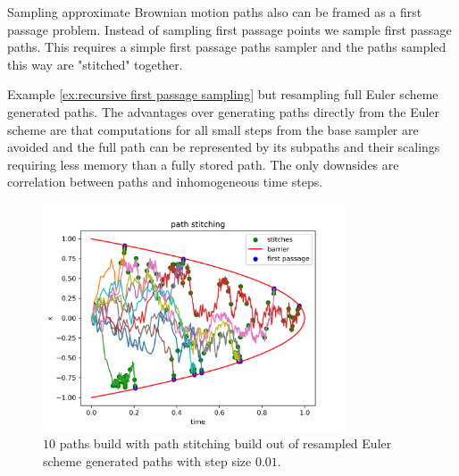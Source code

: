 \documentclass[a4paper,12pt]{article}
\begin{document}
\begin{technique}
  Sampling approximate Brownian motion paths also can be
  framed as a first passage problem. Instead of sampling
  first passage points we sample first passage paths.
  This requires a simple first passage paths sampler and the paths
  sampled this way are "stitched" together.
\end{technique}

\begin{example}
  Example \ref{ex:recursive first passage sampling} but
  resampling full Euler scheme generated paths.
  The advantages over generating paths directly from
  the Euler scheme are that computations for all small steps from the
  base sampler are avoided and the full path
  can be represented by its subpaths and their scalings
  requiring less memory than a fully stored path.
  The only downsides are correlation between paths and
  inhomogeneous time steps.

  \begin{figure}[h!]
    \centering
    \includegraphics[width=0.8\textwidth]{plots/path stitching para.png}
    \caption{ $10$ paths build with path stitching build out of
      resampled Euler scheme generated paths with step size $0.01$.}
    \label{fig:path stitching para}
  \end{figure}
\end{example}


\end{document}
